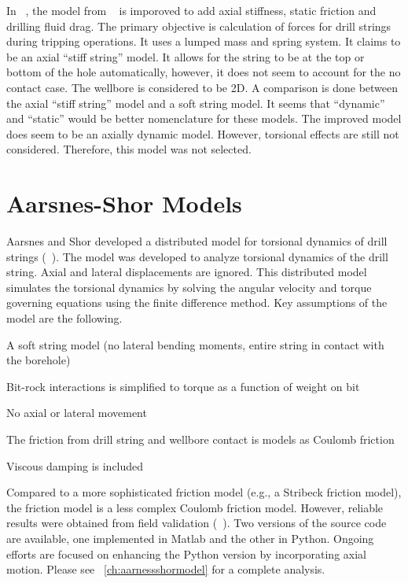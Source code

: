In ~\cite{ref:zamanipour2018a}, the model from ~\cite{ref:miska2015a} is imporoved to add axial stiffness, static friction and drilling fluid drag.  The primary objective is calculation of forces for drill strings during tripping operations.  It uses a lumped mass and spring system.  It claims to be an axial ``stiff string'' model.  It allows for the string to be at the top or bottom of the hole automatically, however, it does not seem to account for the no contact case.  The wellbore is considered to be 2D.  A comparison is done between the axial ``stiff string'' model and a soft string model.  It seems that ``dynamic'' and ``static'' would be better nomenclature for these models.  The improved model does seem to be an axially dynamic model.  However, torsional effects are still not considered.  Therefore, this model was not selected.



\section{Aarsnes-Shor Models}
Aarsnes and Shor developed a distributed model for torsional dynamics of drill strings (~\cite{ref:aarsnes2017a}).  The model was developed to analyze torsional dynamics of the drill string.  Axial and lateral displacements are ignored.  This distributed model simulates the torsional dynamics by solving the angular velocity and torque governing equations using the finite difference method. Key assumptions of the model are the following.
\begin{bulletedlist}
	\item A soft string model (no lateral bending moments, entire string in contact with the borehole)
	\item Bit-rock interactions is simplified to torque as a function of weight on bit
	\item No axial or lateral movement
	\item The friction from drill string and wellbore contact is models as Coulomb friction
    \item Viscous damping is included
\end{bulletedlist}
Compared to a more sophisticated friction model (e.g., a Stribeck friction model), the friction model is a less complex Coulomb friction model. However, reliable results were obtained from field validation (~\cite{ref:aarsnes2017a}). \wording{}\resolvedcomment{} Two versions of the source code are available, one implemented in Matlab and the other in Python.  Ongoing efforts are focused on enhancing the Python version by incorporating axial motion. Please see \chaptername~\ref{ch:aarnessshormodel} for a complete analysis.

